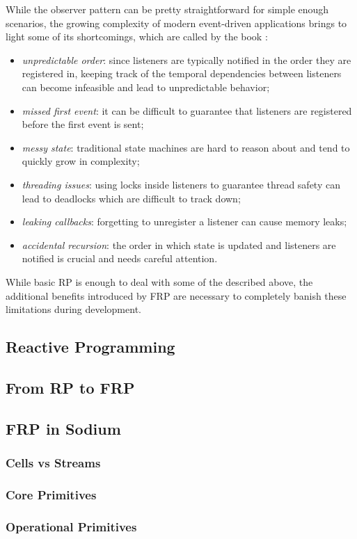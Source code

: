 While the observer pattern can be pretty straightforward for simple enough scenarios, the growing complexity of modern event-driven applications brings to light some of its shortcomings, which are called by the book :
%
\begin{itemize}
    \item \textit{unpredictable order}: since listeners are typically notified in the order they are registered in, keeping track of the temporal dependencies between listeners can become infeasible and lead to unpredictable behavior;
    \item \textit{missed first event}: it can be difficult to guarantee that listeners are registered before the first event is sent;
    \item \textit{messy state}: traditional state machines are hard to reason about and tend to quickly grow in complexity;
    \item \textit{threading issues}: using locks inside listeners to guarantee thread safety can lead to deadlocks which are difficult to track down;
    \item \textit{leaking callbacks}: forgetting to unregister a listener can cause memory leaks;
    \item \textit{accidental recursion}: the order in which state is updated and listeners are notified is crucial and needs careful attention.
\end{itemize}

While basic RP is enough to deal with some of the  described above, the additional benefits introduced by FRP are necessary to completely banish these limitations during development.

\subsection{Reactive Programming}
\label{sec:rp}


\subsection{From RP to FRP}
\label{sec:rp-to-frp}

\subsection{FRP in Sodium}
\label{sec:sodium}

\subsubsection{Cells vs Streams}

\subsubsection{Core Primitives}

\subsubsection{Operational Primitives}

